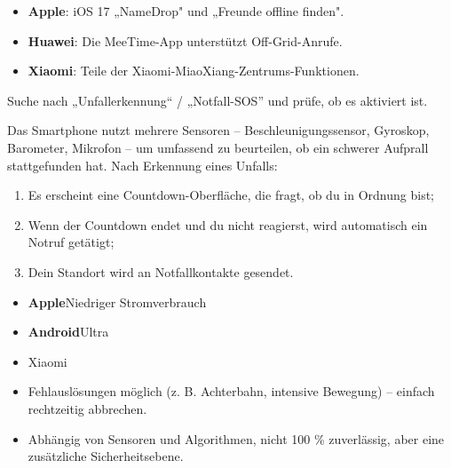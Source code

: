 \begin{itemize}
  \item \textbf{Apple}: iOS 17 „NameDrop" und „Freunde offline finden".
  \item \textbf{Huawei}: Die MeeTime-App unterstützt Off-Grid-Anrufe.
  \item \textbf{Xiaomi}: Teile der Xiaomi-MiaoXiang-Zentrums-Funktionen.
\end{itemize}


Suche nach „Unfallerkennung“ / „Notfall-SOS” und prüfe, ob es aktiviert ist.


Das Smartphone nutzt mehrere Sensoren – Beschleunigungssensor, Gyroskop, Barometer, Mikrofon – um umfassend zu beurteilen, ob ein schwerer Aufprall stattgefunden hat. Nach Erkennung eines Unfalls:

\begin{enumerate}
  \item Es erscheint eine Countdown-Oberfläche, die fragt, ob du in Ordnung bist;
  \item Wenn der Countdown endet und du nicht reagierst, wird automatisch ein Notruf getätigt;
  \item Dein Standort wird an Notfallkontakte gesendet.
\end{enumerate}


\begin{itemize}
  \item \textbf{Apple}Niedriger Stromverbrauch
  \item \textbf{Android}Ultra
\end{itemize}


\begin{itemize}
  \item Xiaomi
  \item Fehlauslösungen möglich (z. B. Achterbahn, intensive Bewegung) – einfach rechtzeitig abbrechen.
  \item Abhängig von Sensoren und Algorithmen, nicht 100 \% zuverlässig, aber eine zusätzliche Sicherheitsebene.
\end{itemize}


